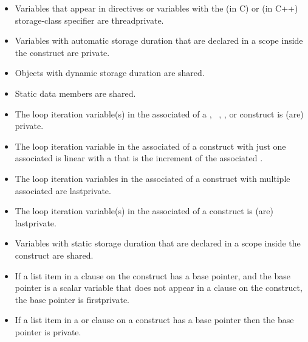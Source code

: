 \begin{ccppspecific}
\begin{itemize}
\item Variables that appear in  directives or
      variables with the  (in C) or
       (in C++) storage-class specifier are threadprivate. 
\item Variables with automatic storage duration that are declared in a scope 
      inside the construct are private.
\item Objects with dynamic storage duration are shared.
\item Static data members are shared.
\item The loop iteration variable(s) in the associated  of a
      , ~, , or 
       construct is (are) private.
\item The loop iteration variable in the associated  of a
       construct with just one associated  is 
      linear with a  that is the increment 
      of the associated .
\item The loop iteration variables in the associated  of a
       construct with multiple associated  are lastprivate.
\item The loop iteration variable(s) in the associated  of a
       construct is (are) lastprivate.
\item Variables with static storage duration that are declared in a scope 
      inside the construct are shared.
\item If a list item in a  clause on the  construct 
      has a base pointer, and the base pointer is a scalar variable that 
      does not appear in a  clause on the construct, the base 
      pointer is firstprivate.
\item If a list item in a  or  clause on a
      construct has a base pointer then the base pointer is private.
\end{itemize}
\end{ccppspecific}


